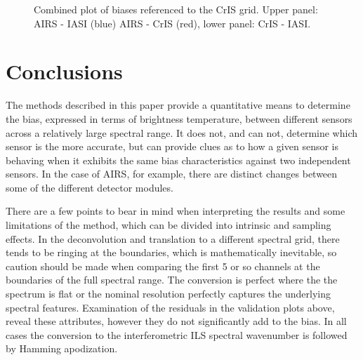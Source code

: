 \documentclass[twocolumn,10pt]{article}
\begin{document}
\begin{figure}[htb]
  \centering
  \caption{\label{fig:orgparagraph21}    Combined plot of biases referenced to the CrIS grid. Upper panel: AIRS - IASI (blue) AIRS - CrIS (red), lower panel: CrIS - IASI.}
  \label{fig:U1}
\end{figure}


\section{Conclusions}
\label{sec:orgheadline13}
The methods described in this paper provide a quantitative means to determine the bias, expressed in terms of brightness temperature, between different sensors across a relatively large spectral range. It does not, and can not, determine which sensor is the more accurate, but can provide clues as to how a given sensor is behaving when it exhibits the same bias characteristics against two independent sensors. In the case of AIRS, for example, there are distinct changes between some of the different detector modules.

There are a few points to bear in mind when interpreting the results and some limitations of the method, which can be divided into intrinsic and sampling effects. In the deconvolution and translation to a different spectral grid, there tends to be ringing at the boundaries, which is mathematically inevitable, so caution should be made when comparing the first 5 or so channels at the boundaries of the full spectral range. The conversion is perfect where the the spectrum is flat or the nominal resolution perfectly captures the underlying spectral features. Examination of the residuals in the validation plots above, reveal these attributes, however they do not significantly add to the bias. In all cases the conversion to the interferometric ILS spectral wavenumber is followed by Hamming apodization.
\end{document}

